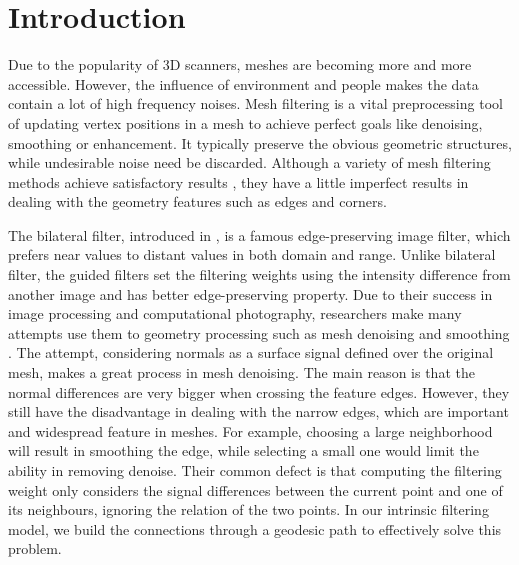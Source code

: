 \section{Introduction}


Due to the popularity of 3D scanners, meshes are becoming more and more accessible.
However, the influence of environment and people makes the data contain a lot of high frequency noises.
Mesh filtering is a vital preprocessing tool of updating vertex positions in a mesh to achieve perfect goals like denoising, smoothing or enhancement.
It typically preserve the obvious geometric structures, while undesirable noise need be discarded.
Although a variety of mesh filtering methods achieve satisfactory results \cite{jones2003non, zheng2011bilateral, he2013mesh, Zhang2015Filter, Wang2015rolling},
they have a little imperfect results in dealing with the geometry features such as edges and corners.


The bilateral filter, introduced in \cite{tomasi1998bilateral}, is a famous edge-preserving image filter, which prefers near values to distant values in both domain and range.
Unlike bilateral filter, the guided filters \cite{Petschnigg2004, he2010guided} set the filtering weights using the intensity difference from another image and has better edge-preserving property.
Due to their success in image processing and computational photography, 
researchers make many attempts use them to geometry processing such as mesh denoising and smoothing \cite{jones2003non, zheng2011bilateral, Solomon2014general, Zhang2015Filter}. 
The attempt, considering normals as a surface signal defined over the original mesh, makes a great process in mesh denoising.
The main reason is that the normal differences are very bigger when crossing the feature edges.
However, they still have the disadvantage in dealing with the narrow edges, which are important and widespread feature in meshes.
For example, choosing a large neighborhood will result in smoothing the edge, while selecting a small one would limit the ability in removing denoise.
Their common defect is that computing the filtering weight only considers the signal differences between the current point and one of its neighbours, ignoring the relation of the two points.
In our intrinsic filtering model, we build the connections through a geodesic path to effectively solve this problem.


